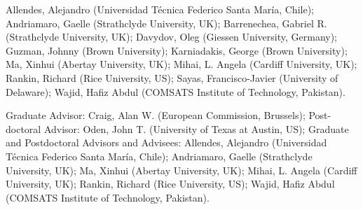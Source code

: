 Allendes, Alejandro (Universidad T\'ecnica Federico Santa
Mar\'ia, Chile); 
Andriamaro, Gaelle (Strathclyde University, UK); 
Barrenechea, Gabriel R. (Strathclyde University, UK); 
Davydov, Oleg (Giessen University, Germany); 
Guzman, Johnny (Brown University); 
Karniadakis, George (Brown University); 
Ma, Xinhui (Abertay University, UK); 
Mihai, L. Angela (Cardiff University, UK); 
Rankin, Richard (Rice University, US); 
Sayas, Francisco-Javier (University of Delaware); 
Wajid, Hafiz Abdul (COMSATS Institute of Technology, Pakistan).

Graduate Advisor: Craig, Alan W. (European Commission, Brussels); Post-doctoral
Advisor: Oden, John T. (University of Texas at Austin, US); Graduate and
Postdoctoral Advisors and Advisees: Allendes, Alejandro (Universidad T\'ecnica
Federico Santa Mar\'ia, Chile); Andriamaro, Gaelle (Strathclyde University, UK);
Ma, Xinhui (Abertay University, UK); Mihai, L. Angela (Cardiff University, UK);
Rankin, Richard (Rice University, US); Wajid, Hafiz Abdul (COMSATS Institute of
Technology, Pakistan).
%
